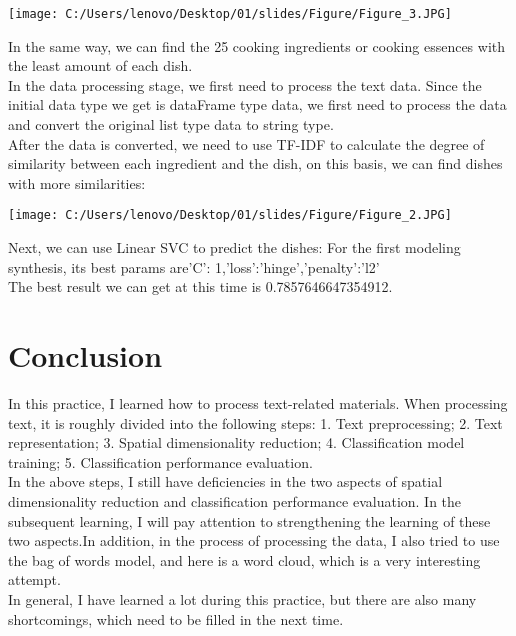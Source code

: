 \begin{minipage}{1\linewidth}
  \centering
  \texttt{[image: C:/Users/lenovo/Desktop/01/slides/Figure/Figure\_3.JPG]} 
\end{minipage}
\text
In the same way, we can find the 25 
cooking ingredients or cooking essences with the least amount of each dish.\\


\text
In the data processing stage, we first need to process the text data. 
Since the initial data type we get is dataFrame type data, we first 
need to process the data and convert the original list type data to string type.\\
After the data is converted, we need to use TF-IDF to calculate the degree of 
    similarity between each ingredient and the dish, on this basis, we can find 
    dishes with more similarities:
    \begin{minipage}{1\linewidth}
      \centering
      \texttt{[image: C:/Users/lenovo/Desktop/01/slides/Figure/Figure\_2.JPG]} 
    \end{minipage}

\text
Next, we can use Linear SVC to predict the dishes:
  For the first modeling synthesis, its best params are'C': 1,'loss':'hinge','penalty':'l2'\\
  The best result we can get at this time is 0.7857646647354912.

  \section*{Conclusion}

  In this practice, I learned how to process text-related materials. 
  When processing text, it is roughly divided into the following steps: 
  1. Text preprocessing; 2. Text representation; 3. Spatial dimensionality reduction; 
  4. Classification model training; 5. Classification performance evaluation. \\
  In the above steps, I still have deficiencies in the two aspects of spatial 
  dimensionality reduction and classification performance evaluation. 
  In the subsequent learning, I will pay attention to strengthening the learning 
  of these two aspects.In addition, in the process of processing the data, I also 
  tried to use the bag of words model, and here is a word cloud, which is a very interesting attempt.\\
  
  In general, I have learned a lot during this practice, but there are also many shortcomings, 
  which need to be filled in the next time.




